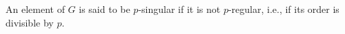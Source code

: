 An element of $G$ is said to be $p$-singular if it is not $p$-regular, i.e., if its order is divisible by $p$.
